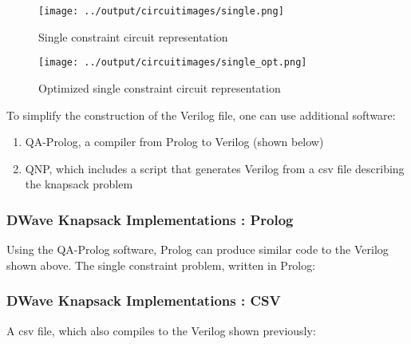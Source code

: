 \documentclass{article}
\begin{document}
\lstset{language=Verilog}


\begin{figure}[h!]
  \texttt{[image: ../output/circuitimages/single.png]}
  \caption{Single constraint circuit representation}
  \label{fig:single}
\end{figure}
\begin{figure}[h!]
  \texttt{[image: ../output/circuitimages/single\_opt.png]}
  \caption{Optimized single constraint circuit representation}
  \label{fig:opt_single}
\end{figure}
\newpage

To simplify the construction of the Verilog file, one can use additional software:
\begin{enumerate}
    \item{QA-Prolog, a compiler from Prolog to Verilog (shown below)}
    \item{QNP, which includes a script that generates Verilog from a csv file describing the knapsack problem}
\end{enumerate}

\subsubsection{DWave Knapsack Implementations : Prolog}

Using the QA-Prolog software, Prolog can produce similar code to the Verilog shown above.
The single constraint problem, written in Prolog:
\lstset{language=Prolog}


\subsubsection{DWave Knapsack Implementations : CSV}

A csv file, which also compiles to the Verilog shown previously:

\end{document}
